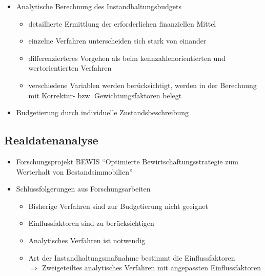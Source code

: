 \documentclass[fleqn,twoside,dvipsnames]{article}
\begin{document}
\begin{itemize}
\begin{itemize}
                \end{itemize}
            \item Analytische Berechnung des Instandhaltungsbudgets
                \begin{itemize}
                    \item detaillierte Ermittlung der erforderlichen finanziellen Mittel
                    \item einzelne Verfahren unterscheiden sich stark von einander
                    \item differenzierteres Vorgehen als beim kennzahlenorientierten und
                    wertorientierten Verfahren
                    \item verschiedene Variablen werden berücksichtigt, werden in der
                    Berechnung mit Korrektur- bzw. Gewichtungsfaktoren belegt
                \end{itemize}
            \item Budgetierung durch individuelle Zustandsbeschreibung
        \end{itemize}
    \subsection{Realdatenanalyse}
        \begin{itemize}
            \item Forschungsprojekt BEWIS 
                \enquote{Optimierte Bewirtschaftungsstrategie zum Werterhalt von Bestandsimmobilien}
            \item Schlussfolgerungen aus Forschungsarbeiten
                \begin{itemize}
                    \item Bisherige Verfahren sind zur Budgetierung nicht geeignet
                    \item Einflussfaktoren sind zu berücksichtigen
                    \item Analytisches Verfahren ist notwendig
                    \item Art der Instandhaltungsmaßnahme bestimmt die Einflussfaktoren\\
                    $\Rightarrow$ Zweigeteiltes analytisches Verfahren mit angepassten Einflussfaktoren
                \end{itemize}
        \end{itemize}
\end{document}
